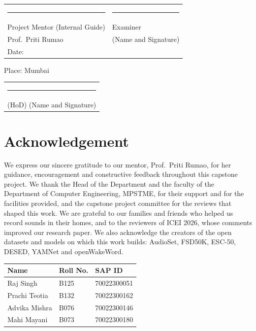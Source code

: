 \documentclass[12pt,a4paper,oneside]{report}
\begin{document}
\vspace{2.5cm}
\noindent\begin{tabular}{@{}p{}p{}@{}}
\rule{5.5cm}{0.4pt} & \rule{5.5cm}{0.4pt}\\
Project Mentor (Internal Guide) & Examiner\\
Prof.\ Priti Rumao & (Name and Signature)\\
Date: & \\
\end{tabular}

\vspace{2cm}
\noindent Place: Mumbai \hfill
\begin{tabular}[t]{@{}l@{}}\rule{5.5cm}{0.4pt}\\ (HoD) (Name and Signature)\end{tabular}

\chapter*{Acknowledgement}
We express our sincere gratitude to our mentor, Prof.\ Priti Rumao, for her guidance, encouragement and constructive feedback throughout this capstone project. We thank the Head of the Department and the faculty of the Department of Computer Engineering, MPSTME, for their support and for the facilities provided, and the capstone project committee for the reviews that shaped this work. We are grateful to our families and friends who helped us record sounds in their homes, and to the reviewers of ICEI 2026, whose comments improved our research paper. We also acknowledge the creators of the open datasets and models on which this work builds: AudioSet, FSD50K, ESC-50, DESED, YAMNet and openWakeWord.

\vspace{1cm}
\begin{center}
\begin{tabular}{lll}
\toprule
\textbf{Name} & \textbf{Roll No.} & \textbf{SAP ID}\\
\midrule
Raj Singh & B125 & 70022300051\\
Prachi Teotia & B132 & 70022300162\\
Advika Mishra & B076 & 70022300146\\
Mahi Mayani & B073 & 70022300180\\
\bottomrule
\end{tabular}
\end{center}
\end{document}
